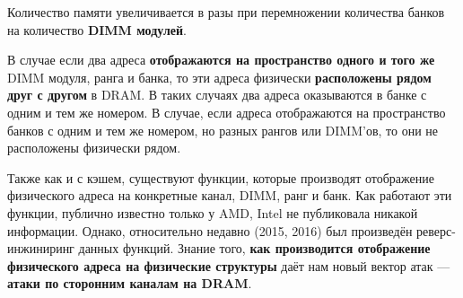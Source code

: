 \begin{frame}{\insertsubsubsection}
{    Количество памяти увеличивается в разы при перемножении количества банков на
    количество \textbf{DIMM модулей}.

  }




   {

    В случае если два адреса \textbf{отображаются на пространство одного и того
      же} DIMM модуля, ранга и банка, то эти адреса физически
    \textbf{расположены рядом друг с другом} в DRAM. В таких случаях два адреса
    оказываются в банке с одним и тем же номером. В случае, если адреса
    отображаются на пространство банков с одним и тем же номером, но разных
    рангов или DIMM'ов, то они не расположены физически рядом.

    Также как и с кэшем, существуют функции, которые производят отображение
    физического адреса на конкретные канал, DIMM, ранг и банк. Как работают эти
    функции, публично известно только у AMD, Intel не публиковала никакой
    информации. Однако, относительно недавно (2015, 2016) был произведён
    реверс-инжиниринг данных функций. Знание того, \textbf{как производится
      отображение физического адреса на физические структуры} даёт нам новый
    вектор атак --- \textbf{атаки по сторонним каналам на DRAM}.

  }

\end{frame}